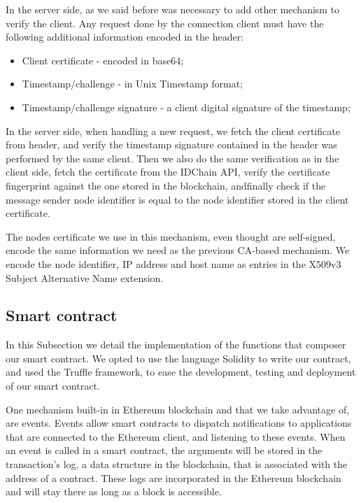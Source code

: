 In the server side, as we said before was necessary to add other mechanism to verify the client.
Any request done by the connection client must have the following additional information encoded in the header:

\begin{itemize}
  \item Client certificate - encoded in base64;
  \item Timestamp/challenge - in Unix Timestamp format;
  \item Timestamp/challenge signature - a client digital signature of the timestamp;
\end{itemize}

In the server side, when handling a new request, we fetch the client certificate from header, and verify the timestamp signature contained in the header was performed by the same client.
Then we also do the same verification as in the client side, fetch the certificate from the IDChain API, verify the certificate fingerprint against the one stored in the blockchain, andfinally check if the message sender node identifier is equal to the node identifier stored in the client certificate.

The nodes certificate we use in this mechanism, even thought are self-signed, encode the same information we need as the previous CA-based mechanism.
We encode the node identifier, IP address and host name as entries in the X509v3 Subject Alternative Name extension.

\subsection{Smart contract}\label{subsection:smart-contract}

In this Subsection we detail the implementation of the functions that composer our smart contract.
We opted to use the language Solidity to write our contract, and used the Truffle framework, to ease the development, testing and deployment of our smart contract.

One mechanism built-in in Ethereum blockchain and that we take advantage of, are events.
Events allow smart contracts to dispatch notifications to applications that are connected to the Ethereum client, and listening to these events.
When an event is called in a smart contract, the arguments will be stored in the transaction's log, a data structure in the blockchain, that is associated with the address of a contract.
These logs are incorporated in the Ethereum blockchain and will stay there as long as a block is accessible.

